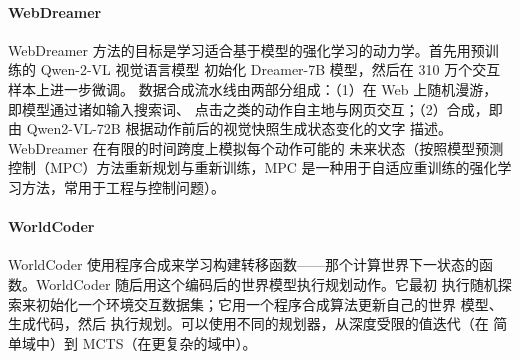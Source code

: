 \paragraph{WebDreamer} WebDreamer 方法的目标是学习适合基于模型的强化学习的动力学。首先用预训练的 Qwen-2-VL 视觉语言模型 \citep{wang2024qwen2} 初始化 Dreamer-7B 模型，然后在 310 万个交互样本上进一步微调。
数据合成流水线由两部分组成：（1）在 Web 上随机漫游，
即模型通过诸如输入搜索词、
点击之类的动作自主地与网页交互；（2）合成，即由 Qwen2-VL-72B 根据动作前后的视觉快照生成状态变化的文字
描述。WebDreamer 在有限的时间跨度上模拟每个动作可能的
未来状态（按照模型预测控制（MPC）方法重新规划与重新训练，MPC 是一种用于自适应重训练的强化学习方法，常用于工程与控制问题）。


\paragraph{WorldCoder}
WorldCoder 使用程序合成来学习构建转移函数——那个计算世界下一状态的函数。WorldCoder 随后用这个编码后的世界模型执行规划动作。它最初
执行随机探索来初始化一个环境交互数据集；它用一个程序合成算法更新自己的世界
模型、生成代码，然后
执行规划。可以使用不同的规划器，从深度受限的值迭代（在
简单域中）到 MCTS（在更复杂的域中）\citep{browne2012survey}。


